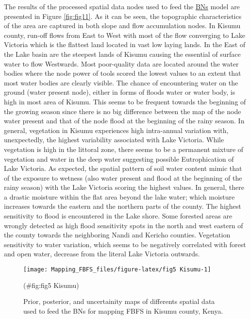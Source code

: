 \documentclass[12pt,oneside]{article}
\begin{document}
The results of the processed spatial data nodes used to feed the \href{https://en.wikipedia.org/wiki/Bayesian_network}{BNs} model are presented in Figure \ref{fig:fig11}. As it can be seen, the topographic characteristics of the area are captured in both slope and flow accumulation nodes. In Kisumu county, run-off flows from East to West with most of the flow converging to Lake Victoria which is the flattest land located in vast low laying lands. In the East of the Lake basin are the steepest lands of Kisumu causing the essential of surface water to flow Westwards. Most poor-quality data are located around the water bodies where the node power of tools scored the lowest values to an extent that most water bodies are clearly visible. The chance of encountering water on the ground (water present node), either in forms of floods water or water body, is high in most area of Kisumu. This seems to be frequent towards the beginning of the growing season since there is no big difference between the map of the node water present and that of the node flood at the beginning of the rainy season. In general, vegetation in Kisumu experiences high intra-annual variation with, unexpectedly, the highest variability associated with Lake Victoria. While vegetation is high in the littoral zone, there seems to be a permanent mixture of vegetation and water in the deep water suggesting possible Eutrophication of Lake Victoria. As expected, the spatial pattern of soil water content mimic that of the exposure to wetness (also water present and flood at the beginning of the rainy season) with the Lake Victoria scoring the highest values. In general, there a drastic moisture within the flat area beyond the lake water; which moisture increases towards the eastern and the northern parts of the county. The highest sensitivity to flood is encountered in the Lake shore. Some forested areas are wrongly detected as high flood sensitivity spots in the north and west eastern of the county towards the neighboring Nandi and Kericho counties. Vegetation sensitivity to water variation, which seems to be negatively correlated with forest and open water, decrease from the literal Lake Victoria outwards.

\begin{figure}[!htbp]

{\centering \texttt{[image: Mapping\_FBFS\_files/figure-latex/fig5 Kisumu-1]} 

}

\caption{Prior, posterior, and uncertainity maps of differents spatial data used to feed the BNs for mapping FBFS in Kisumu county, Kenya.}(\#fig:fig5 Kisumu)
\end{figure}
\end{document}
